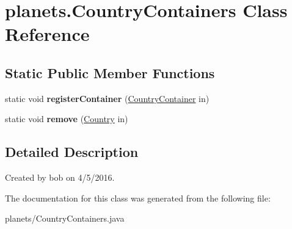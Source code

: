 \hypertarget{classplanets_1_1_country_containers}{}\section{planets.\+Country\+Containers Class Reference}
\label{classplanets_1_1_country_containers}
\subsection*{Static Public Member Functions}
\begin{DoxyCompactItemize}
\item 
static void {\bfseries register\+Container} (\hyperlink{interfaceplanets_1_1_country_container}{Country\+Container} in)\hypertarget{classplanets_1_1_country_containers_a3321632bb6c962898955732e6f52670e}{}\label{classplanets_1_1_country_containers_a3321632bb6c962898955732e6f52670e}

\item 
static void {\bfseries remove} (\hyperlink{classplanets_1_1_country}{Country} in)\hypertarget{classplanets_1_1_country_containers_ae6a687a803e061e01742f2fea88d803d}{}\label{classplanets_1_1_country_containers_ae6a687a803e061e01742f2fea88d803d}

\end{DoxyCompactItemize}


\subsection{Detailed Description}
Created by bob on 4/5/2016. 

The documentation for this class was generated from the following file\+:\begin{DoxyCompactItemize}
\item 
planets/Country\+Containers.\+java\end{DoxyCompactItemize}
